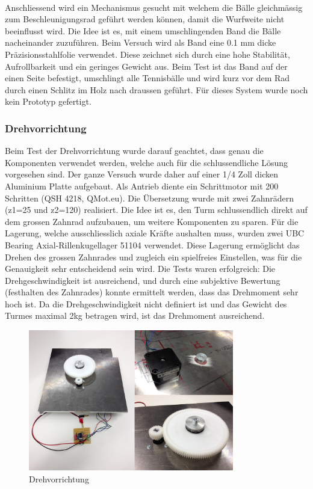 \noindent
\\Anschliessend wird ein Mechanismus gesucht mit welchem die Bälle 
gleichmässig zum Beschleunigungsrad geführt werden können, damit die Wurfweite 
nicht beeinflusst wird. Die Idee ist es, mit einem umschlingenden Band die 
Bälle nacheinander zuzuführen. Beim Versuch wird als Band eine 0.1 mm dicke 
Präzisionsstahlfolie verwendet. Diese zeichnet sich durch eine hohe Stabilität, 
Aufrollbarkeit und ein geringes Gewicht aus. Beim Test ist das Band auf der 
einen Seite befestigt, umschlingt alle Tennisbälle und wird kurz vor dem Rad 
durch einen Schlitz im Holz nach draussen geführt. Für dieses System wurde noch kein Prototyp gefertigt. \\


\subsubsection{Drehvorrichtung}
Beim Test der Drehvorrichtung wurde darauf geachtet, dass genau die Komponenten verwendet werden, welche auch für die schlussendliche Lösung vorgesehen sind. Der ganze Versuch wurde daher auf einer 1/4 Zoll dicken Aluminium Platte aufgebaut. Als Antrieb diente ein Schrittmotor mit 200 Schritten (QSH 4218, QMot.eu). Die Übersetzung wurde mit zwei Zahnrädern (z1=25 und z2=120) realisiert. Die Idee ist es, den Turm schlussendlich direkt auf dem grossen Zahnrad aufzubauen, um weitere Komponenten zu sparen. Für die Lagerung, welche ausschliesslich axiale Kräfte aushalten muss, wurden zwei UBC Bearing Axial-Rillenkugellager 51104 verwendet. Diese Lagerung ermöglicht das Drehen des grossen Zahnrades und zugleich ein spielfreies Einstellen, was für die Genauigkeit sehr entscheidend sein wird.
Die Tests waren erfolgreich: Die Drehgeschwindigkeit ist ausreichend, und durch eine subjektive Bewertung (festhalten des Zahnrades) konnte ermittelt werden, dass das Drehmoment sehr hoch ist. Da die Drehgeschwindigkeit nicht definiert ist und das Gewicht des Turmes maximal 2kg betragen wird, ist das Drehmoment ausreichend.

\begin{figure}[h!]          
	\centering             
	\includegraphics[width=0.8\textwidth]{fig/Drehvorrichtung.png}    
	\caption{Drehvorrichtung}
	
	\label{fig:Drehvorrichtung}
\end{figure}
\noindent



